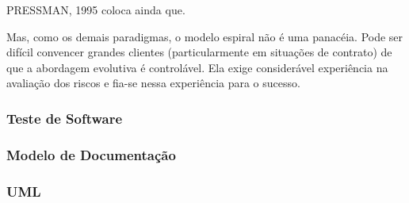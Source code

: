 PRESSMAN, 1995 coloca ainda que.

\begin{citacao}
Mas, como os demais paradigmas, o modelo espiral não é uma 	 panacéia. Pode ser difícil convencer grandes clientes (particularmente em situações de contrato) de que a abordagem evolutiva é controlável. Ela exige considerável experiência na avaliação dos riscos e fia-se nessa experiência para o sucesso. 
\end{citacao}


\subsubsection{Teste de Software}
\subsubsection{Modelo de Documentação}
\subsubsection{UML}
